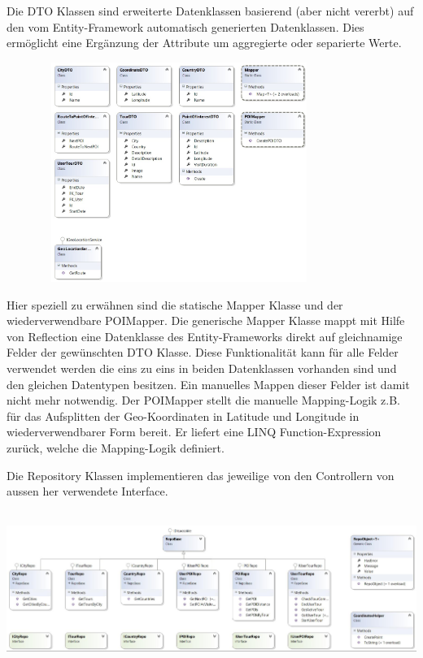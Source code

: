 \documentclass[a4paper,10pt,xetex]{article}
\begin{document}
  Die DTO Klassen sind erweiterte Datenklassen basierend (aber nicht vererbt) auf den vom Entity-Framework automatisch
  generierten Datenklassen. Dies erm\"oglicht eine Erg\"anzung der Attribute um aggregierte oder separierte Werte.

\includegraphics[width=4.4134in,height=2.8154in]{klassendiagramm_backend2.jpg}

  Hier speziell zu erw\"ahnen sind die statische Mapper Klasse und der wiederverwendbare POIMapper. Die generische Mapper
  Klasse mappt mit Hilfe von Reflection eine Datenklasse des Entity-Frameworks direkt auf gleichnamige Felder der
  gew\"unschten DTO Klasse. Diese Funktionalit\"at kann f\"ur alle Felder verwendet werden die eins zu eins in beiden
  Datenklassen vorhanden sind und den gleichen Datentypen besitzen. Ein manuelles Mappen dieser Felder ist damit nicht
  mehr notwendig. Der POIMapper stellt die manuelle Mapping-Logik z.B. f\"ur das Aufsplitten der Geo-Koordinaten in
  Latitude und Longitude in wiederverwendbarer Form bereit. Er liefert eine LINQ Function-Expression zur\"uck, welche die
  Mapping-Logik definiert.


  Die Repository Klassen implementieren das jeweilige von den Controllern von aussen her verwendete Interface.

\begin{center}
  \includegraphics[width=6.5in,height=1.9925in]{klassendiagramm_backend3.jpg}
\end{center}
\end{document}
